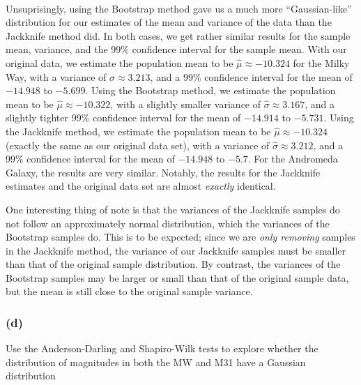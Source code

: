 \documentclass[11pt]{article}
\begin{document}
    \begin{center}
    \end{center}
    { \hspace*{\fill} \\}
    
    Unsuprisingly, using the Bootstrap method gave us a much more
``Gaussian-like'' distribution for our estimates of the mean and
variance of the data than the Jackknife method did. In both cases, we
get rather similar results for the sample mean, variance, and the 99\%
confidence interval for the sample mean. With our original data, we
estimate the population mean to be \(\hat{\mu} \approx -10.324\) for the
Milky Way, with a variance of \(\hat{\sigma} \approx 3.213\), and a 99\%
confidence interval for the mean of \(-14.948\) to \(-5.699\). Using the
Bootstrap method, we estimate the population mean to be
\(\hat{\mu} \approx -10.322\), with a slightly smaller variance of
\(\hat{\sigma} \approx 3.167\), and a slightly tighter 99\% confidence
interval for the mean of \(-14.914\) to \(-5.731\). Using the Jackknife
method, we estimate the population mean to be
\(\hat{\mu} \approx -10.324\) (exactly the same as our original data
set), with a variance of \(\hat{\sigma} \approx 3.212\), and a 99\%
confidence interval for the mean of \(-14.948\) to \(-5.7\). For the
Andromeda Galaxy, the results are very similar. Notably, the results for
the Jackknife estimates and the original data set are almost
\emph{exactly} identical.

One interesting thing of note is that the variances of the Jackknife
samples do not follow an approximately normal distribution, which the
variances of the Bootstrap samples do. This is to be expected; since we
are \emph{only removing} samples in the Jackknife method, the variance
of our Jackknife samples must be smaller than that of the original
sample distribution. By contrast, the variances of the Bootstrap samples
may be larger or small than that of the original sample data, but the
mean is still close to the original sample variance.

    \hypertarget{d}{%
\subsubsection{(d)}\label{d}}

Use the Anderson-Darling and Shapiro-Wilk tests to explore whether the
distribution of magnitudes in both the MW and M31 have a Gaussian
distribution
\end{document}
